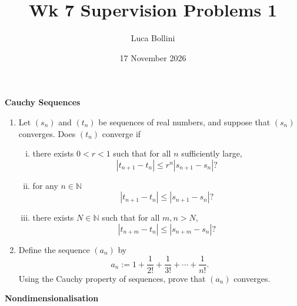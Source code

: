 \documentclass{article}
\title{Wk 7 Supervision Problems 1}
\author{Luca Bollini}
\date{17 November 2026}
\newcommand{\N}{\mathbb{N}}
\begin{document}
\maketitle

\begin{center}
\huge{\textbf{Cauchy Sequences}}
\end{center}

\begin{enumerate}
    \item Let $(s_n)$ and $(t_n)$ be sequences of real numbers, and suppose that $(s_n)$ converges. Does $(t_n)$ converge if
    \begin{enumerate}[(i)]
        \item there exists $0<r<1$ such that for all $n$ sufficiently large,
        \[
        |t_{n+1}-t_{n}| \leq r^n|s_{n+1}-s_n|\text{?}
        \]
        \item for any $n\in\N$
        \[
        |t_{n+1}-t_{n}| \leq |s_{n+1}-s_n|\text{?}
        \]
        \item there exists $N\in\N$ such that for all $m,n>N$,
        \[
        |t_{n+m}-t_{n}| \leq |s_{n+m}-s_n|\text{?}
        \]
    \end{enumerate}

    \item Define the sequence $(a_n)$ by
    \[
    a_n:= 1+\frac{1}{2!}+\frac{1}{3!}+\cdots+\frac{1}{n!}.
    \]
    Using the Cauchy property of sequences, prove that $(a_n)$ converges.
\end{enumerate}

\begin{center}
\huge{\textbf{Nondimensionalisation}}
\end{center}
\end{document}
